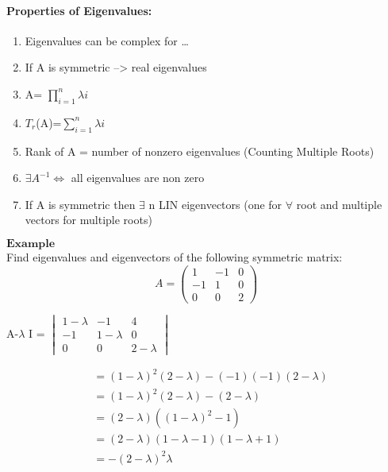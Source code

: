 \documentclass[]{article}
\providecommand{\tightlist}{%
  \setlength{\itemsep}{0pt}\setlength{\parskip}{0pt}}
\let\oldparagraph\paragraph
\renewcommand{\paragraph}[1]{\oldparagraph{#1}\mbox{}}
\begin{document}
\hspace{3cm}

\paragraph{Properties of Eigenvalues:}\label{properties-of-eigenvalues}

\begin{enumerate}
\def\labelenumi{\roman{enumi})}
\tightlist
\item
  Eigenvalues can be complex for \ldots{}
\item
  If A is symmetric --\textgreater{} real eigenvalues
\item
  \textbar{}A\textbar{}= \(\prod\limits_{i=1}^{n} \lambda{i}\)
\item
  \(T_{r}\)(A)=\(\sum\limits_{i=1}^{n} \lambda{i}\)
\item
  Rank of A = number of nonzero eigenvalues (Counting Multiple Roots)
\item
  \(\exists A^{-1} \Longleftrightarrow\) all eigenvalues are non zero
\item
  If A is symmetric then \(\exists\) n LIN eigenvectors (one for
  \(\forall\) root and multiple vectors for multiple roots)
\end{enumerate}

\newpage

\(\mathbf{Example}\)\\
 Find eigenvalues and eigenvectors of the following symmetric matrix:\\

\[A=\begin{pmatrix}  1 & -1 & 0\\ -1 & 1 & 0\\ 0 & 0 & 2\end{pmatrix}\]

\textbar{}A-\(\lambda\) I\textbar{} =
\(\begin{vmatrix} 1-\lambda & -1 & 4 \\ -1 & 1-\lambda & 0 \\ 0 & 0 & 2-\lambda\end{vmatrix}\)

\begin{align}
     &=(1-\lambda)^2(2-\lambda)-(-1)(-1)(2-\lambda) \\
     &= (1-\lambda)^2(2-\lambda)-(2-\lambda)\\
     &=(2-\lambda)((1-\lambda)^2-1) \\
     &=(2-\lambda)(1-\lambda -1)(1-\lambda +1)\\
     &=-(2-\lambda)^2\lambda
\end{align}
\end{document}
